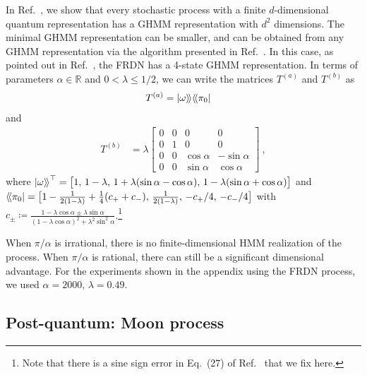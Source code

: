 \documentclass[prx,nofootinbib,onecolumn,showkeys,groupaddress,preprintnumbers,floatfix,
superscriptaddress]{revtex4-1}
\newcommand{\dbra}[1]{\bra{ \! \langle #1}}
\newcommand{\dket}[1]{\ket{ #1 \rangle \!}}
\begin{document}
In Ref.~\cite{Riechers25_Identifiability}, we show that every 
stochastic process with a finite $d$-dimensional quantum representation has a GHMM representation with $d^2$ dimensions.
The minimal GHMM representation 
can be 
smaller, and can be obtained from any GHMM representation via the algorithm presented in Ref.~\cite{Uppe97a}.
%
In this case, 
as pointed out in Ref.~\cite{Fanizza24_Quantum},
the FRDN has a 4-state GHMM representation.  
In terms of parameters $\alpha \in \mathbb{R}$ and 
$0 < \lambda \leq 1/2$,
we can write the
matrices $T^{(a)}$ and $T^{(b)}$ 
as 
\begin{align}
T^{(a)} &= \dket{\omega} \! \dbra{\pi_0}
\end{align}
and 
\begin{align}
T^{(b)} &=
\lambda
\begin{bmatrix}
0&0&0&0 \\
0&1&0&0 \\
0&0&\cos \alpha & -\sin \alpha \\
0&0& \sin \alpha & \cos \alpha 
\end{bmatrix}
~,
\end{align}
where $\dket{\omega}^\top = \bigl[ 
1, \, 
1-\lambda, \, 1 + \lambda (\sin \alpha - \cos \alpha) , \, 
1 - \lambda (\sin \alpha + \cos \alpha)
\bigr]$
and $\dbra{\pi_0} = 
\bigl[ 1-\tfrac{1}{2(1-\lambda)} + \tfrac{1}{4}(c_+ + c_-), \, \tfrac{1}{2(1-\lambda)}, \, -c_+/4, \, -c_-/4 \bigr]
$
with $c_\pm \coloneqq \frac{1 - \lambda \cos \alpha \pm \lambda \sin \alpha}{(1 - \lambda \cos \alpha )^2 + \lambda^2 \sin^2 \alpha}$.\footnote{Note that there is a sine sign error in Eq.~(27) of Ref.~\cite{Fanizza24_Quantum} that we fix here.}


When $\pi/\alpha$ is irrational, there is no finite-dimensional HMM realization of the process.
When $\pi/\alpha$ is rational, there can still be a significant dimensional advantage. For the experiments shown in the appendix using the FRDN process, we used $\alpha=2000, \, \lambda=0.49$.


\subsection{Post-quantum: Moon process}
\end{document}
